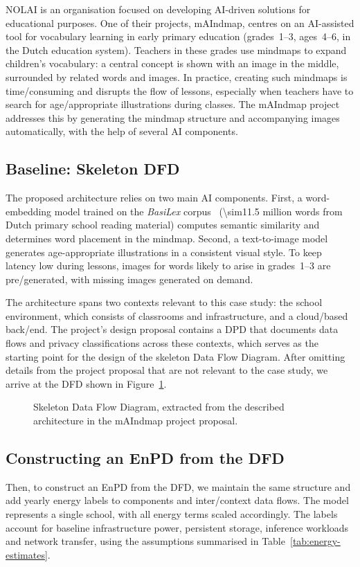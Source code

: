 NOLAI is an organisation focused on developing AI-driven solutions for educational purposes.
One of their projects, mAIndmap, centres on an AI-assisted tool for vocabulary learning in early primary education (grades~\numrange{1}{3}, ages~\numrange{4}{6}, in the Dutch education system).
Teachers in these grades use mindmaps to expand children's vocabulary: a central concept is shown with an image in the middle, surrounded by related words and images.
In practice, creating such mindmaps is time\-/consuming and disrupts the flow of lessons, especially when teachers have to search for age\-/appropriate illustrations during classes.
The mAIndmap project addresses this by generating the mindmap structure and accompanying images automatically, with the help of several AI components.

\subsection{Baseline: Skeleton DFD}
The proposed architecture relies on two main AI components.
First, a word-embedding model trained on the \emph{BasiLex} corpus~\cite{tellings2014basilex} (\num{\sim11.5} million words from Dutch primary school reading material) computes semantic similarity and determines word placement in the mindmap.
Second, a text-to-image model generates age-appropriate illustrations in a consistent visual style.
To keep latency low during lessons, images for words likely to arise in grades~\numrange{1}{3} are pre\-/generated, with missing images generated on demand.

The architecture spans two contexts relevant to this case study: the school environment, which consists of classrooms and infrastructure, and a cloud\-/based back\-/end.
The project's design proposal contains a DPD that documents data flows and privacy classifications across these contexts, which serves as the starting point for the design of the skeleton Data Flow Diagram.
After omitting details from the project proposal that are not relevant to the case study, we arrive at the DFD shown in Figure~\ref{fig:dfd}.

\begin{figure}[ht]
  \centering
  \caption{Skeleton Data Flow Diagram, extracted from the described architecture in the mAIndmap project proposal.}%
  \label{fig:dfd}
\end{figure}

\subsection{Constructing an EnPD from the DFD}
Then, to construct an EnPD from the DFD, we maintain the same structure and add yearly energy labels to components and inter\-/context data flows.
The model represents a single school, with all energy terms scaled accordingly.
The labels account for baseline infrastructure power, persistent storage, inference workloads and network transfer, using the assumptions summarised in Table~\ref{tab:energy-estimates}.

